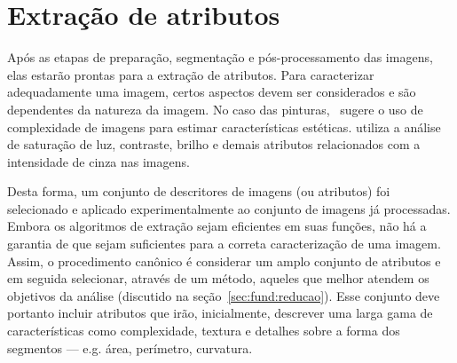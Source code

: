 
             
\section{Extração de atributos}
\label{sec:atributos}

Após as etapas de preparação, segmentação e pós-processamento das
imagens, elas estarão prontas para a extração de atributos. Para
caracterizar adequadamente uma imagem, certos aspectos devem ser
considerados e são dependentes da natureza da imagem. No caso das
pinturas,~\citeauthor{penousal} sugere o uso de complexidade de
imagens para estimar características
estéticas. \citeauthor{manovich,manovich2,manovich3} utiliza a análise
de saturação de luz, contraste, brilho e demais atributos relacionados
com a intensidade de cinza nas imagens.


Desta forma, um conjunto de descritores de imagens (ou atributos) foi
selecionado e aplicado experimentalmente ao conjunto de imagens já
processadas. Embora os algoritmos de extração sejam eficientes em suas
funções, não há a garantia de que sejam suficientes para a correta
caracterização de uma imagem. Assim, o procedimento canônico é
considerar um amplo conjunto de atributos e em seguida selecionar,
através de um método, aqueles que melhor atendem os objetivos da
análise (discutido na seção~\ref{sec:fund:reducao}). Esse conjunto
deve portanto incluir atributos que irão, inicialmente, descrever uma
larga gama de características como complexidade, textura e detalhes
sobre a forma dos segmentos --- e.g. área, perímetro, curvatura.

